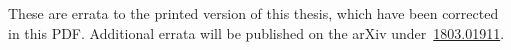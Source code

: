 \documentclass[b5paper]{book}
\begin{document}


\makeatletter{}\makeatother






\backmatter
\fancyfoot[CE]{}
\fancyfoot[CO]{}

\printindex

\begingroup
\renewcommand\chapter[2]{\backmattertitle{Bibliography}}
{}
\endgroup






\label{errata}

These are errata to the printed version of this thesis,
    which have been corrected in this PDF.
Additional errata will be published
    on the arXiv under~\href{https://arxiv.org/abs/1803.01911}{1803.01911}.



\end{document}
